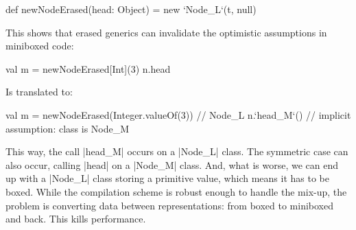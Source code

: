 \begin{lstlisting-nobreak}
 def newNodeErased(head: Object) =
   new `Node_L`(t, null)
\end{lstlisting-nobreak}

This shows that erased generics can invalidate the optimistic assumptions in miniboxed code:

\begin{lstlisting-nobreak}
 val m = newNodeErased[Int](3)
 n.head
\end{lstlisting-nobreak}

Is translated to:

\begin{lstlisting-nobreak}
 val m = newNodeErased(Integer.valueOf(3)) // Node_L
 n.`head_M`()      // implicit assumption: class is Node_M
\end{lstlisting-nobreak}

This way, the call |head_M| occurs on a |Node_L| class. The symmetric case can also occur, calling |head| on a |Node_M| class. And, what is worse, we can end up with a |Node_L| class storing a primitive value, which means it has to be boxed. While the compilation scheme is robust enough to handle the mix-up, the problem is converting data between representations: from boxed to miniboxed and back. This kills performance.
%
%
%
%
